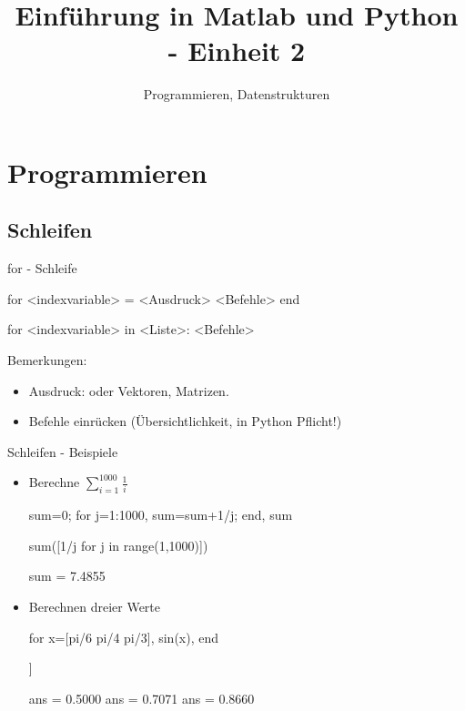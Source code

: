 \documentclass[hyperref={xetex}]{beamer}
\title{Einführung in Matlab und Python - Einheit 2}
\subtitle{Programmieren, Datenstrukturen}
\begin{document}
\titlepage




\section{Programmieren}
 

\subsection{Schleifen}
%
%
\begin{frame}[fragile]{for - Schleife}
\begin{matlabin}
for <indexvariable> = <Ausdruck>
  <Befehle>
end
\end{matlabin}
\begin{pyin}
for <indexvariable> in <Liste>:
  <Befehle>
\end{pyin}
\begin{pyin}
\end{pyin}
\alert{Bemerkungen:} 
\begin{itemize}
\item Ausdruck:  oder Vektoren, Matrizen. 
\item \alert{Befehle} einrücken (Übersichtlichkeit, in Python Pflicht!) 
\end{itemize}

\end{frame}

%
%
\begin{frame}[fragile]{Schleifen - Beispiele}
\begin{itemize}
\item Berechne $\sum_{i=1}^{1000} \frac{1}{i}$
\begin{matlabin}
sum=0; for j=1:1000, sum=sum+1/j; end, sum
\end{matlabin}
\begin{pyin}
sum([1/j for j in range(1,1000)])
\end{pyin}
\begin{matlab}
sum =  7.4855 
\end{matlab}
\item Berechnen dreier Werte
\begin{matlabin}
for x=[pi/6 pi/4 pi/3], sin(x), end
\end{matlabin}
\begin{pyin}
[sin(x) for x in [pi/6,pi/4,pi/3]]
\end{pyin}
\begin{matlab}
ans =    0.5000
ans =    0.7071
ans =    0.8660 
\end{matlab}
\end{itemize}
\end{frame}
\end{document}
